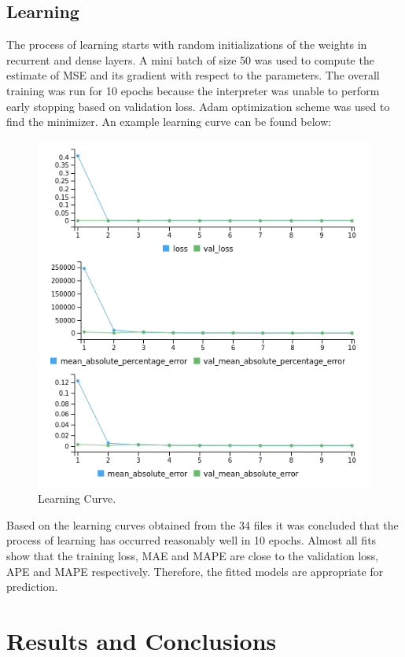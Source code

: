 \documentclass[%
aip,
amsmath,amssymb,
reprint,%
]{revtex4-1}
\begin{document}
\subsection{Learning}

The process of learning starts with random initializations of the weights in recurrent and dense layers. A mini batch of size 50 was used to compute the estimate of MSE and its gradient with respect to the parameters. The overall training was run for 10 epochs because the interpreter was unable to perform early stopping based on validation loss. Adam optimization scheme was used to find the minimizer. An example learning curve can be found below:

\begin{figure}[h!]
	\includegraphics[width=\linewidth]{learning.png}
	\caption{Learning Curve.}
	\label{fig:learning}
\end{figure}

Based on the learning curves obtained from the 34 files it was concluded that the process of learning has occurred reasonably well in 10 epochs. Almost all fits show that the training loss, MAE and MAPE are close to the validation loss, APE and MAPE respectively. Therefore, the fitted models are appropriate for prediction.

\section{Results and Conclusions}
\end{document}
